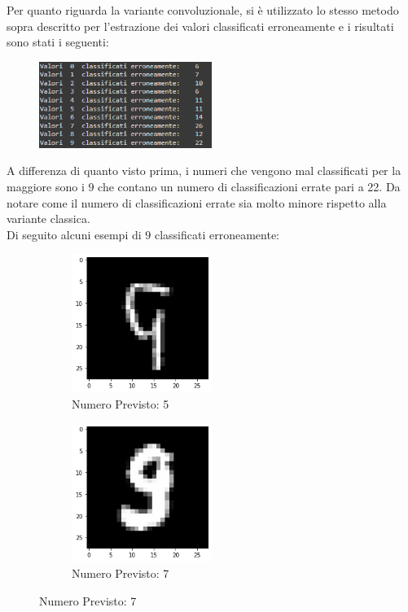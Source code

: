 \documentclass[12pt, a4paper]{article}
\begin{document}
Per quanto riguarda la variante convoluzionale, si è utilizzato lo stesso metodo sopra descritto per l'estrazione dei valori classificati erroneamente e i risultati sono stati i seguenti:
\begin{figure}[H]
    \centering
    \includegraphics[width=0.50\textwidth]{ErrateConv.png}
\end{figure}
A differenza di quanto visto prima, i numeri che vengono mal classificati per la maggiore sono i \(9\) che contano un numero di classificazioni errate pari a 22. Da notare come il numero di classificazioni errate sia molto minore rispetto alla variante classica.\\
Di seguito alcuni esempi di \(9\) classificati erroneamente:

\begin{figure}[H]
    \begin{subfigure}{0.5\textwidth}
        \centering
        \caption{Numero Previsto: 5}
        \includegraphics[width=0.50\textwidth]{nove1.png}
    \end{subfigure}
    \begin{subfigure}{0.5\textwidth}
        \centering
        \caption{Numero Previsto: 7}
        \includegraphics[width=0.50\textwidth]{nove2.png}
    \end{subfigure}
\end{figure}
\end{document}
